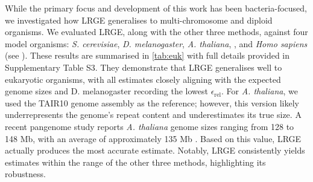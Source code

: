 \documentclass[unnumsec,webpdf,modern,large]{oup-authoring-template}
\theoremstyle{thmstyleone}%
\theoremstyle{thmstyletwo}%
\theoremstyle{thmstylethree}%
\newcommand{\lrge}{LRGE}
\newcommand{\relerr}{$\epsilon_{\text{rel}}$}
\begin{document}
While the primary focus and development of this work has been bacteria-focused, we investigated how \lrge{} generalises to multi-chromosome and diploid organisms. We evaluated \lrge{}, along with the other three methods, against four model organisms: \textit{S. cerevisiae}, \textit{D. melanogaster}, \textit{A. thaliana}, , and \textit{Homo sapiens} (see ). 
These results are summarised in \autoref{tab:euk} with full details provided in Supplementary Table S3. They demonstrate that \lrge{} generalises well to eukaryotic organisms, with all estimates closely aligning with the expected genome sizes and D. melanogaster recording the lowest \relerr{}. For \textit{A. thaliana}, we used the TAIR10 genome assembly as the reference; however, this version likely underrepresents the genome's repeat content and underestimates its true size. A recent pangenome study reports \textit{A. thaliana} genome sizes ranging from 128 to 148 Mb, with an average of approximately 135 Mb \citep{lian2024pan}. Based on this value, \lrge{} actually produces the most accurate estimate. Notably, \lrge{} consistently yields estimates within the range of the other three methods, highlighting its robustness.
\end{document}
